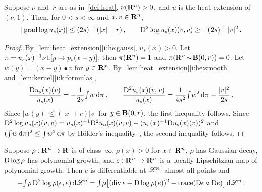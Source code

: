 \documentclass[a4paper,twoside,leqno]{article}
\begin{document}
\begin{lemma}
    \label{lem:semiconvex}
    Suppose $\nu$ and~$r$ are as in~\ref{def:heat}, $\nu(\mathbf{R}^{n}) > 0$, and $u$ is the heat
    extension of $(\nu,1)$. Then, for $0 < s < \infty$ and $x, v \in \mathbf{R}^{n}$,
    \begin{displaymath}
        |\operatorname{grad} \log u_s(x)| \le (2s)^{-1} (|x| + r) \,, \qquad
        \mathrm{D}^2 \log u_s(x)(v,v) \ge - (2s)^{-1} |v|^2 \,.
    \end{displaymath}
\end{lemma}

\begin{proof}
    By~\ref{lem:heat_extension}\ref{i:he:gauss}, $u_s(x) > 0$. Let $\pi = u_s(x)^{-1} \nu
    \restrict [y \mapsto p_s(x-y)]$; then $\pi(\mathbf{R}^{n}) = 1$ and $\pi(\mathbf{R}^{n} \!\sim\!
    \mathbf{B}(0,r)) = 0$. Let $w(y) = (x - y) \bullet v$ for $y \in \mathbf{R}^{n}$.
    By~\ref{lem:heat_extension}\ref{i:he:smooth} and~\ref{lem:kernel}\ref{i:k:formulas},
    \begin{displaymath}
        \frac{\mathrm{D} u_s(x)(v)}{u_s(x)} = - \frac{1}{2s} {\textstyle\int_{}^{}} w \,\mathrm{d} \pi \,, \qquad
        \frac{\mathrm{D}^2 u_s(x)(v,v)}{u_s(x)} = \frac{1}{4s^2} {\textstyle\int_{}^{}} w^2 \,\mathrm{d} \pi -
        \frac{|v|^2}{2s} \,.
    \end{displaymath}
    Since $|w(y)| \le (|x| + r) |v|$ for $y \in \mathbf{B}(0,r)$, the first inequality follows. Since
    $\mathrm{D}^2 \log u_s(x)(v,v) = u_s(x)^{-1} \mathrm{D}^2 u_s(x)(v,v) - (u_s(x)^{-1} \mathrm{D} u_s(x)(v))^2$ and
    $({\textstyle\int_{}^{}} w \,\mathrm{d} \pi)^2 \le {\textstyle\int_{}^{}} w^2 \,\mathrm{d} \pi$ by H\"older's
    inequality~\cite[2.4.14]{Federer1969}, the second inequality follows.
\end{proof}

\begin{lemma}
    \label{lem:ibp}
    Suppose $\rho : \mathbf{R}^{n} \to \mathbf{R}$ is of class~$\infty$, $\rho(x) > 0$ for $x \in
    \mathbf{R}^{n}$, $\rho$ has Gaussian decay, $\mathrm{D} \log \rho$ has polynomial growth, and $e :
    \mathbf{R}^{n} \to \mathbf{R}^{n}$ is a~locally Lipschitzian map of polynomial growth. Then $e$ is
    differentiable at $\mathscr{L}^{n}$~almost all points and
    \begin{displaymath}
        - {\textstyle\int_{}^{}} \rho \, \mathrm{D}^2 \log \rho(e,e) \,\mathrm{d} \mathscr{L}^{n}
        = {\textstyle\int_{}^{}} \rho \bigl[ (\mathrm{div}\, e + \mathrm{D} \log \rho(e))^2 - \operatorname{trace}(\mathrm{D} e \circ
        \mathrm{D} e) \bigr] \,\mathrm{d} \mathscr{L}^{n} \,.
    \end{displaymath}
\end{lemma}
\end{document}
